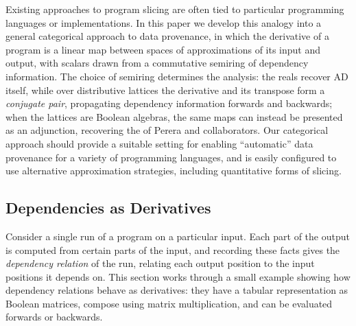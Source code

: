 Existing approaches to program slicing are often tied to particular programming languages or implementations.
In this paper we develop this analogy into a general categorical approach to data provenance, in
which the derivative of a program is a linear map between spaces of approximations of its input and output,
with scalars drawn from a commutative semiring of dependency information. The choice of semiring determines
the analysis: the reals recover AD itself, while over distributive lattices the derivative and its transpose
form a \emph{conjugate pair}, propagating dependency information forwards and backwards; when the lattices are
Boolean algebras, the same maps can instead be presented as an adjunction, recovering the \GPS of Perera and
collaborators. Our categorical approach should provide a suitable setting for enabling ``automatic''
data provenance for a variety of programming languages, and is easily configured to use alternative
approximation strategies, including quantitative forms of slicing.

\subsection{Dependencies as Derivatives}
\label{sec:introduction:galois-slicing}

Consider a single run of a program on a particular input. Each part of the output is computed from
certain parts of the input, and recording these facts gives the \emph{dependency relation} of the run,
relating each output position to the input positions it depends on. This section works through a small example
showing how dependency relations behave as derivatives: they have a tabular representation as Boolean
matrices, compose using matrix multiplication, and can be evaluated forwards or backwards.

